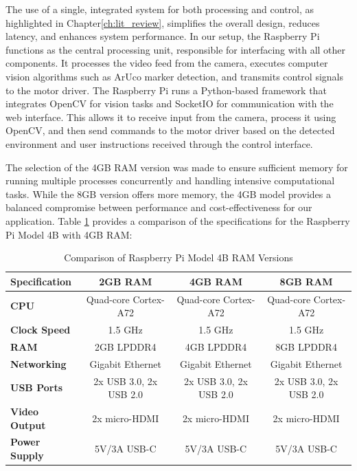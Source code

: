 The use of a single, integrated system for both processing and control, as highlighted in Chapter\ref{ch:lit_review}, simplifies the overall design, reduces latency, and enhances system performance. In our setup, the Raspberry Pi functions as the central processing unit, responsible for interfacing with all other components. It processes the video feed from the camera, executes computer vision algorithms such as ArUco marker detection, and transmits control signals to the motor driver. The Raspberry Pi runs a Python-based framework that integrates OpenCV for vision tasks and SocketIO for communication with the web interface. This allows it to receive input from the camera, process it using OpenCV, and then send commands to the motor driver based on the detected environment and user instructions received through the control interface.

The selection of the 4GB RAM version was made to ensure sufficient memory for running multiple processes concurrently and handling intensive computational tasks. While the 8GB version offers more memory, the 4GB model provides a balanced compromise between performance and cost-effectiveness for our application. Table \ref{table:pi_specs} provides a comparison of the specifications for the Raspberry Pi Model 4B with 4GB RAM:


\begin{table}[h!]
	\centering
	\begin{tabular}{|l|c|c|c|}
		\hline
		\textbf{Specification} & \textbf{2GB RAM} & \textbf{4GB RAM} & \textbf{8GB RAM} \\
		\hline
		\textbf{CPU} & Quad-core Cortex-A72 & Quad-core Cortex-A72 & Quad-core Cortex-A72 \\
		\hline
		\textbf{Clock Speed} & 1.5 GHz & 1.5 GHz & 1.5 GHz \\
		\hline
		\textbf{RAM} & 2GB LPDDR4 & 4GB LPDDR4 & 8GB LPDDR4 \\
		\hline
		\textbf{Networking} & Gigabit Ethernet & Gigabit Ethernet & Gigabit Ethernet \\
		\hline
		\textbf{USB Ports} & 2x USB 3.0, 2x USB 2.0 & 2x USB 3.0, 2x USB 2.0 & 2x USB 3.0, 2x USB 2.0 \\
		\hline
		\textbf{Video Output} & 2x micro-HDMI & 2x micro-HDMI & 2x micro-HDMI \\
		\hline
		\textbf{Power Supply} & 5V/3A USB-C & 5V/3A USB-C & 5V/3A USB-C \\
		\hline
	\end{tabular}
	\caption{Comparison of Raspberry Pi Model 4B RAM Versions}
	\label{table:pi_specs}
\end{table}

